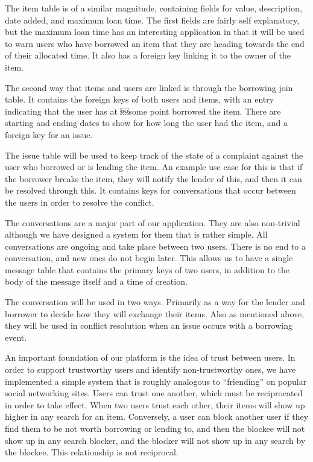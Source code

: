 \documentclass{acm_proc_article-sp}
\begin{document}
The item table is of a similar magnitude, containing fields for value, description, date added, and maximum loan time. The first fields are fairly self explanatory, but the maximum loan time has an interesting application in that it will be used to warn users who have borrowed an item that they are heading towards the end of their allocated time. It also has a foreign key linking it to the owner of the item.

The second way that items and users are linked is through the borrowing join table. It contains the foreign keys of both users and items, with an entry indicating that the user has at
￼some point borrowed the item. There are starting and ending dates to show for how long the user had the item, and a foreign key for an issue.

The issue table will be used to keep track of the state of a complaint against the user who borrowed or is lending the item. An example use case for this is that if the borrower breaks the item, they will notify the lender of this, and then it can be resolved through this. It contains keys for conversations that occur between the users in order to resolve the conflict.

The conversations are a major part of our application. They are also non-trivial although we have designed a system for them that is rather simple. All conversations are ongoing and take place between two users. There is no end to a conversation, and new ones do not begin later. This allows us to have a single message table that contains the primary keys of two users, in addition to the body of the message itself and a time of creation.

The conversation will be used in two ways. Primarily as a way for the lender and borrower to decide how they will exchange their items. Also as mentioned above, they will be used in conflict resolution when an issue occurs with a borrowing event.

An important foundation of our platform is the idea of trust between users. In order to support trustworthy users and identify non-trustworthy ones, we have implemented a simple system that is roughly analogous to ``friending'' on popular social networking sites. Users can trust one another, which must be reciprocated in order to take effect. When two users trust each other, their items will show up higher in any search for an item. Conversely, a user can block another user if they find them to be not worth borrowing or lending to, and then the blockee will not show up in any search blocker, and the blocker will not show up in any search by the blockee. This relationship is not reciprocal.
\end{document}
